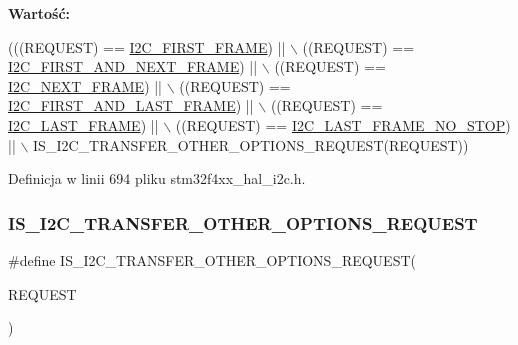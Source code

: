 {\bfseries Wartość\+:}
\begin{DoxyCode}
(((REQUEST) == \hyperlink{group___i2_c___xfer_options__definition_gab23601bfc0eaddbc4823d193b7e49a9c}{I2C\_FIRST\_FRAME})              || \(\backslash\)
                                                       ((REQUEST) == 
      \hyperlink{group___i2_c___xfer_options__definition_ga1396d7236a5e1d52c9fd6d182d1f2869}{I2C\_FIRST\_AND\_NEXT\_FRAME})     || \(\backslash\)
                                                       ((REQUEST) == 
      \hyperlink{group___i2_c___xfer_options__definition_ga8790cd8bea154c662fc6a6d6ef6b9083}{I2C\_NEXT\_FRAME})               || \(\backslash\)
                                                       ((REQUEST) == 
      \hyperlink{group___i2_c___xfer_options__definition_ga56aa81e0fe6ff902f3b0dd0bc9e11b96}{I2C\_FIRST\_AND\_LAST\_FRAME})     || \(\backslash\)
                                                       ((REQUEST) == 
      \hyperlink{group___i2_c___xfer_options__definition_gaf732cc5827622242ce14645f67749f40}{I2C\_LAST\_FRAME})               || \(\backslash\)
                                                       ((REQUEST) == 
      \hyperlink{group___i2_c___xfer_options__definition_gac316c2c562991d4629151b517c2c02d8}{I2C\_LAST\_FRAME\_NO\_STOP})       || \(\backslash\)
                                                       IS\_I2C\_TRANSFER\_OTHER\_OPTIONS\_REQUEST(REQUEST))
\end{DoxyCode}


Definicja w linii 694 pliku stm32f4xx\+\_\+hal\+\_\+i2c.\+h.

\mbox{\label{group___i2_c___i_s___r_t_c___definitions_ga13a3986011ca018dd12ff39ea3bec11b}} 
\subsubsection{\texorpdfstring{I\+S\+\_\+\+I2\+C\+\_\+\+T\+R\+A\+N\+S\+F\+E\+R\+\_\+\+O\+T\+H\+E\+R\+\_\+\+O\+P\+T\+I\+O\+N\+S\+\_\+\+R\+E\+Q\+U\+E\+ST}{IS\_I2C\_TRANSFER\_OTHER\_OPTIONS\_REQUEST}}
{\footnotesize\ttfamily \#define I\+S\+\_\+\+I2\+C\+\_\+\+T\+R\+A\+N\+S\+F\+E\+R\+\_\+\+O\+T\+H\+E\+R\+\_\+\+O\+P\+T\+I\+O\+N\+S\+\_\+\+R\+E\+Q\+U\+E\+ST(\begin{DoxyParamCaption}\item[{}]{R\+E\+Q\+U\+E\+ST }\end{DoxyParamCaption})}

